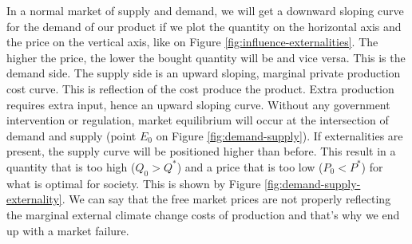 \documentclass[../summary.tex]{subfiles}
\begin{document}
	  In a normal market of supply and demand, we will get a downward sloping curve for the demand of our product if we plot the quantity on the horizontal axis and the price on the vertical axis, like on Figure \ref{fig:influence-externalities}. The higher the price, the lower the bought quantity will be and vice versa. This is the demand side. The supply side is an upward sloping, marginal private production cost curve. This is  reflection of the cost produce the product. Extra production requires extra input, hence an upward sloping curve. Without any government intervention or regulation, market equilibrium will occur at the intersection of demand and supply (point $E_{0}$ on Figure \ref{fig:demand-supply}). If externalities are present, the supply curve will be positioned higher than before. This result in a quantity that is too high ($Q_{0} > Q^{*}$) and a price that is too low ($P_{0} < P^{*}$) for what is optimal for society. This is shown by Figure \ref{fig:demand-supply-externality}. We can say that the free market prices are not properly reflecting the marginal external climate change costs of production and that's why we end up with a market failure.
	  
\end{document}
